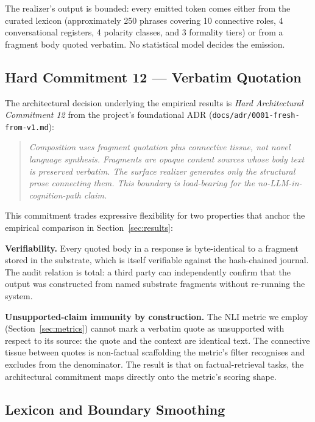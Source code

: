 The realizer's output is bounded: every emitted token comes
either from the curated lexicon (approximately 250 phrases
covering 10 connective roles, 4 conversational registers, 4
polarity classes, and 3 formality tiers) or from a fragment
body quoted verbatim. No statistical model decides the
emission.

\subsection{Hard Commitment 12 --- Verbatim Quotation}
\label{sec:hc12}

The architectural decision underlying the empirical results
is \emph{Hard Architectural Commitment 12} from the project's
foundational ADR (\texttt{docs/adr/0001-fresh-from-v1.md}):

\begin{quote}
\emph{Composition uses fragment quotation plus connective tissue,
not novel language synthesis. Fragments are opaque content
sources whose body text is preserved verbatim. The surface
realizer generates only the structural prose connecting them.
This boundary is load-bearing for the no-LLM-in-cognition-path
claim.}
\end{quote}

This commitment trades expressive flexibility for two
properties that anchor the empirical comparison in
Section~\ref{sec:results}:

\textbf{Verifiability.} Every quoted body in a \hyphae{} response
is byte-identical to a fragment stored in the substrate, which
is itself verifiable against the hash-chained journal. The
audit relation is total: a third party can independently confirm
that the output was constructed from named substrate fragments
without re-running the system.

\textbf{Unsupported-claim immunity by construction.} The NLI
metric we employ (Section~\ref{sec:metrics}) cannot mark a
verbatim quote as unsupported with respect to its source: the
quote and the context are identical text. The connective tissue
between quotes is non-factual scaffolding the metric's filter
recognises and excludes from the denominator. The result is that
on factual-retrieval tasks, the architectural commitment maps
directly onto the metric's scoring shape.

\subsection{Lexicon and Boundary Smoothing}
\label{sec:smoothing}

